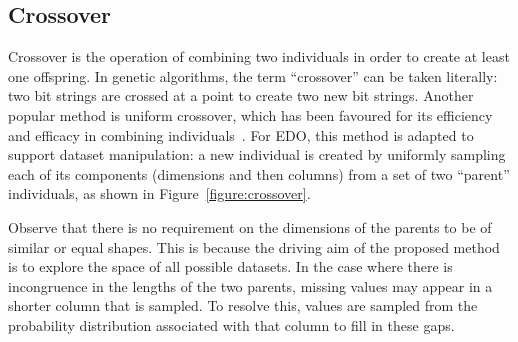 \subsection{Crossover}

Crossover is the operation of combining two individuals in order to create at
least one offspring. In genetic algorithms, the term ``crossover'' can be taken
literally: two bit strings are crossed at a point to create two new bit strings.
Another popular method is uniform crossover, which has been favoured for its
efficiency and efficacy in combining individuals~\cite{Semenkin2012}. For EDO,
this method is adapted to support dataset manipulation: a new individual is
created by uniformly sampling each of its components (dimensions and then
columns) from a set of two ``parent'' individuals, as shown in
Figure~\ref{figure:crossover}.


Observe that there is no requirement on the dimensions of the parents to be of
similar or equal shapes. This is because the driving aim of the proposed method
is to explore the space of all possible datasets. In the case where there is
incongruence in the lengths of the two parents, missing values may appear in a
shorter column that is sampled. To resolve this, values are sampled from the
probability distribution associated with that column to fill in these gaps.



